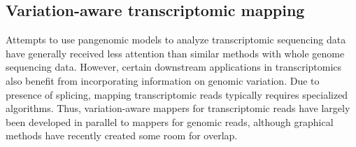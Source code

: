 
    



\subsection{Variation-aware transcriptomic mapping}

Attempts to use pangenomic models to analyze transcriptomic sequencing data have generally received less attention than similar methods with whole genome sequencing data.
However, certain downstream applications in transcriptomics also benefit from incorporating information on genomic variation.
Due to presence of splicing, mapping transcriptomic reads typically requires specialized algorithms.
Thus, variation-aware mappers for transcriptomic reads have largely been developed in parallel to mappers for genomic reads, although graphical methods have recently created some room for overlap.

